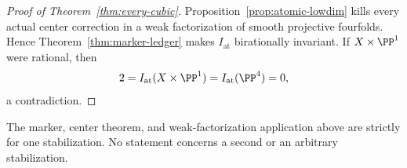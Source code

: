 \begin{proof}[Proof of Theorem~\ref{thm:every-cubic}]
Proposition~\ref{prop:atomic-lowdim} kills every actual center correction in
a weak factorization of smooth projective fourfolds.  Hence
Theorem~\ref{thm:marker-ledger} makes \(I_{\mathrm{at}}\) birationally
invariant.  If \(X\times\PP^1\) were rational, then
\[
 2=I_{\mathrm{at}}(X\times\PP^1)
 =I_{\mathrm{at}}(\PP^4)=0,
\]
a contradiction.
%
\end{proof}

\begin{remark}[Scope]
The marker, center theorem, and weak-factorization application above are
strictly for one stabilization.  No statement concerns a second or an
arbitrary stabilization.
\end{remark}
